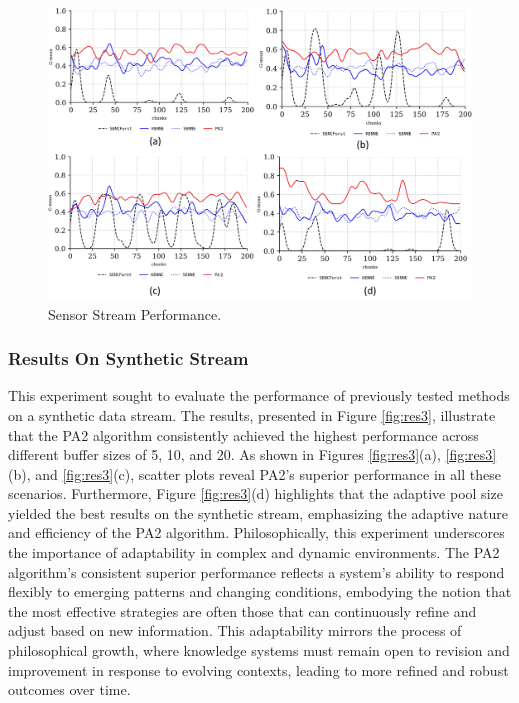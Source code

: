 \begin{figure}[!ht]
	\centering
	\includegraphics[width=1\linewidth]{5_Emerging/images/res2.png}
	\caption{Sensor Stream Performance.}

	\label{fig:res2}
\end{figure}				

\subsubsection{Results On Synthetic Stream}
\label{sec:synthetic}
This experiment sought to evaluate the performance of previously tested methods on a synthetic data stream. The results, presented in Figure \ref{fig:res3}, illustrate that the PA2 algorithm consistently achieved the highest performance across different buffer sizes of 5, 10, and 20. As shown in Figures \ref{fig:res3}(a), \ref{fig:res3}(b), and \ref{fig:res3}(c), scatter plots reveal PA2's superior performance in all these scenarios. Furthermore, Figure \ref{fig:res3}(d) highlights that the adaptive pool size yielded the best results on the synthetic stream, emphasizing the adaptive nature and efficiency of the PA2 algorithm.
Philosophically, this experiment underscores the importance of adaptability in complex and dynamic environments. The PA2 algorithm’s consistent superior performance reflects a system's ability to respond flexibly to emerging patterns and changing conditions, embodying the notion that the most effective strategies are often those that can continuously refine and adjust based on new information. This adaptability mirrors the process of philosophical growth, where knowledge systems must remain open to revision and improvement in response to evolving contexts, leading to more refined and robust outcomes over time.

